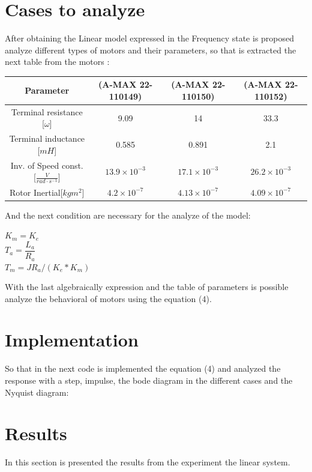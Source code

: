 \documentclass[12pt]{article}
\newcommand{\Matlab}{\textsc{Matlab}}
\begin{document}
\section{Cases to analyze}
After obtaining the Linear model expressed in the Frequency state is proposed analyze different types of motors and their parameters, so that is extracted the next table from the motors :
\begin{center}
\renewcommand{\arraystretch}{1.5}
\begin{tabular}{|c|c|c|c|}
	\hline
	Parameter&(A-MAX 22-110149)& (A-MAX 22-110150)& (A-MAX 22-110152) \\
	\hline
	Terminal resistance [$\omega$]& 9.09 &14  &  33.3\\
	\hline
	Terminal inductance [$mH$]&0.585  & 0.891 & 2.1 \\
	\hline
	Inv. of Speed const. [$\frac{V}{rad\cdot s^{-1}}$]&$13.9\times 10^{-3}$  & $17.1\times 10^{-3}$ &$26.2\times 10^{-3}$  \\
	\hline
	Rotor Inertial[$kgm^{2}$]& $4.2 \times 10^{-7}$ & $4.13\times 10^{-7}$ &$4.09\times 10^{-7}$  \\
	\hline
\end{tabular}
\end{center}
And the next condition are necessary for the analyze of the model:

\begin{center}
	$K_{m}=K_{e}$\\
	$T_{a}=\dfrac{L_{a}}{R_{a}}$\\
	$T_{m} = JR_{a}/(K_{e}*K_{m})$ 

\end{center}

With the last algebraically expression and the table of parameters is possible analyze the behavioral of  motors using the equation (4).


\section{Implementation}
So that in the next code is implemented the equation (4) and analyzed the response with a step, impulse, the bode diagram in the different cases and the Nyquist diagram:\\

 

\section{Results}
In this section is presented the results from the experiment the linear system.
\end{document}
